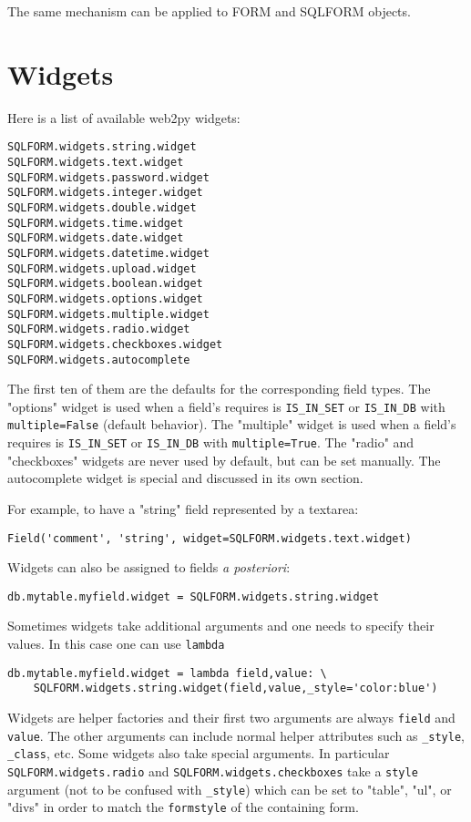 \documentclass[justified,sixbynine,notoc]{tufte-book}
\def\ft{\small\tt}
\begin{document}
\begin{fullwidth}
The same mechanism can be applied to FORM and SQLFORM objects.

\goodbreak\section{Widgets}

Here is a list of available web2py widgets:
\begin{lstlisting}
SQLFORM.widgets.string.widget
SQLFORM.widgets.text.widget
SQLFORM.widgets.password.widget
SQLFORM.widgets.integer.widget
SQLFORM.widgets.double.widget
SQLFORM.widgets.time.widget
SQLFORM.widgets.date.widget
SQLFORM.widgets.datetime.widget
SQLFORM.widgets.upload.widget
SQLFORM.widgets.boolean.widget
SQLFORM.widgets.options.widget
SQLFORM.widgets.multiple.widget
SQLFORM.widgets.radio.widget
SQLFORM.widgets.checkboxes.widget
SQLFORM.widgets.autocomplete
\end{lstlisting}

The first ten of them are the defaults for the corresponding field types. The "options" widget is used when a field's requires is {\ft IS\_IN\_SET} or {\ft IS\_IN\_DB} with {\ft multiple=False} (default behavior). The "multiple" widget is used when a field's requires is {\ft IS\_IN\_SET} or {\ft IS\_IN\_DB} with {\ft multiple=True}. The "radio" and "checkboxes" widgets are never used by default, but can be set manually. The autocomplete widget is special and discussed in its own section.

For example, to have a "string" field represented by a textarea:
\begin{lstlisting}
Field('comment', 'string', widget=SQLFORM.widgets.text.widget)
\end{lstlisting}

Widgets can also be assigned to fields {\it a posteriori}:

\begin{lstlisting}
db.mytable.myfield.widget = SQLFORM.widgets.string.widget
\end{lstlisting}

Sometimes widgets take additional arguments and one needs to specify their values. In this case one can use {\ft lambda}

\begin{lstlisting}
db.mytable.myfield.widget = lambda field,value: \
    SQLFORM.widgets.string.widget(field,value,_style='color:blue')
\end{lstlisting}

Widgets are helper factories and their first two arguments are always {\ft field} and {\ft value}. The other arguments can include normal helper attributes such as {\ft \_style}, {\ft \_class}, etc. Some widgets also take special arguments. In particular {\ft SQLFORM.widgets.radio} and {\ft SQLFORM.widgets.checkboxes} take a {\ft style} argument (not to be confused with {\ft \_style}) which can be set to "table", "ul", or "divs" in order to match the {\ft formstyle} of the containing form.


\end{fullwidth}
\end{document}
